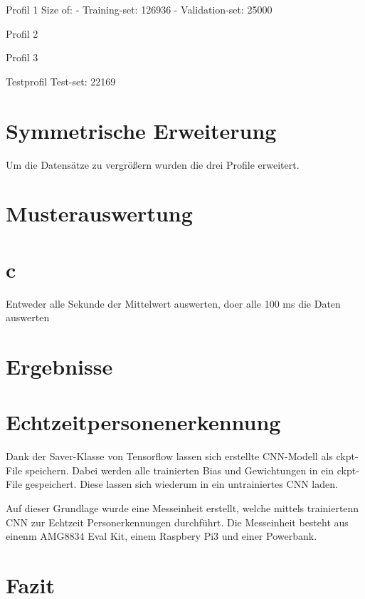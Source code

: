 Profil 1
Size of:
- Training-set:         126936
- Validation-set:       25000

Profil 2



Profil 3


Testprofil Test-set:             22169

\section{Symmetrische Erweiterung}

Um die Datensätze zu vergrößern wurden die drei Profile erweitert. 



\section{Musterauswertung}







\section{c}

Entweder alle Sekunde der Mittelwert auswerten, doer alle 100 ms die Daten auswerten 

\section{Ergebnisse}

\section{Echtzeitpersonenerkennung}

Dank der Saver-Klasse von Tensorflow lassen sich erstellte CNN-Modell als ckpt-File speichern. Dabei werden alle trainierten Bias und Gewichtungen in ein ckpt-File gespeichert. Diese lassen sich wiederum in ein untrainiertes CNN laden.

Auf dieser Grundlage wurde eine Messeinheit erstellt, welche mittels trainiertenn CNN zur Echtzeit Personerkennungen durchführt. Die Messeinheit besteht aus einenm AMG8834 Eval Kit, einem Raspbery Pi3 und einer Powerbank.



 

\section{Fazit}




